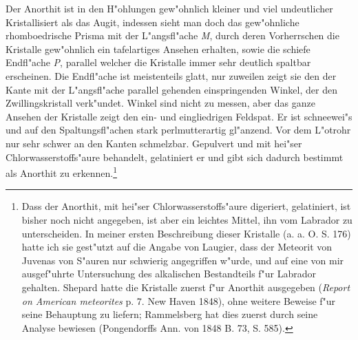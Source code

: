 \documentclass[a4paper, 11pt, oneside]{article}
\begin{document}
Der Anorthit ist in den H"ohlungen gew"ohnlich kleiner und viel undeutlicher Kristallisiert als das Augit, indessen sieht man doch das gew"ohnliche rhomboedrische Prisma mit der L"angsfl"ache \emph{M}, durch deren Vorherrschen die Kristalle gew"ohnlich ein tafelartiges Ansehen erhalten, sowie die schiefe Endfl"ache \emph{P}, parallel welcher die Kristalle immer sehr deutlich spaltbar erscheinen. Die Endfl"ache ist meistenteils glatt, nur zuweilen zeigt sie den der Kante mit der L"angsfl"ache parallel gehenden einspringenden Winkel, der den Zwillingskristall verk"undet. Winkel sind nicht zu messen, aber das ganze Ansehen der Kristalle zeigt den ein- und eingliedrigen Feldspat. Er ist schneewei"s und auf den Spaltungsfl"achen stark perlmutterartig gl"anzend. Vor dem L"otrohr nur sehr schwer an den Kanten schmelzbar. Gepulvert und mit hei"ser Chlorwasserstoffs"aure behandelt, gelatiniert er und gibt sich dadurch bestimmt als Anorthit zu erkennen.\footnote{Dass der Anorthit, mit hei"ser Chlorwasserstoffs"aure digeriert, gelatiniert, ist bisher noch nicht angegeben, ist aber ein leichtes Mittel, ihn vom Labrador zu unterscheiden. In meiner ersten Beschreibung dieser Kristalle (a. a. O. S. 176) hatte ich sie gest"utzt auf die Angabe von Laugier, dass der Meteorit von Juvenas von S"auren nur schwierig angegriffen w"urde, und auf eine von mir ausgef"uhrte Untersuchung des alkalischen Bestandteils f"ur Labrador gehalten. Shepard hatte die Kristalle zuerst f"ur Anorthit ausgegeben (\emph{Report on American meteorites} p. 7. New Haven 1848), ohne weitere Beweise f"ur seine Behauptung zu liefern; Rammelsberg hat dies zuerst durch seine Analyse bewiesen (Pongendorffs Ann. von 1848 B. 73, S. 585).}
\end{document}
